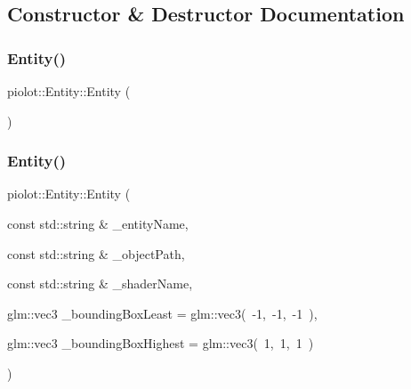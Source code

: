 \subsection{Constructor \& Destructor Documentation}
\mbox{\label{classpiolot_1_1_entity_af79da1eeca5dbb28414ca7e54e6c6d42}} 
\subsubsection{\texorpdfstring{Entity()}{Entity()}\hspace{0.1cm}{\footnotesize\ttfamily [1/2]}}
{\footnotesize\ttfamily piolot\+::\+Entity\+::\+Entity (\begin{DoxyParamCaption}{ }\end{DoxyParamCaption})\hspace{0.3cm}{\ttfamily [default]}}

\mbox{\label{classpiolot_1_1_entity_ad6a8344aece7f5c4b63f46623f5bed18}} 
\subsubsection{\texorpdfstring{Entity()}{Entity()}\hspace{0.1cm}{\footnotesize\ttfamily [2/2]}}
{\footnotesize\ttfamily piolot\+::\+Entity\+::\+Entity (\begin{DoxyParamCaption}\item[{const std\+::string \&}]{\+\_\+entity\+Name,  }\item[{const std\+::string \&}]{\+\_\+object\+Path,  }\item[{const std\+::string \&}]{\+\_\+shader\+Name,  }\item[{glm\+::vec3}]{\+\_\+bounding\+Box\+Least = {\ttfamily glm\+:\+:vec3(~-\/1,~-\/1,~-\/1~)},  }\item[{glm\+::vec3}]{\+\_\+bounding\+Box\+Highest = {\ttfamily glm\+:\+:vec3(~1,~1,~1~)} }\end{DoxyParamCaption})}

\mbox{\label{classpiolot_1_1_entity_a7264c4056ad0f48408e1edfab38fe4e8}} 
